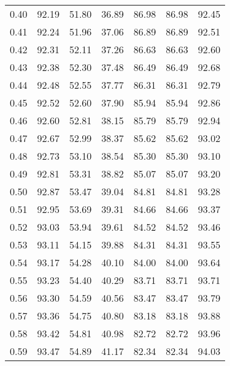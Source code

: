 \begin{tabular}{|c|c|c|c|c|c|c|}
      0.40 &     92.19 &     51.80 &      36.89 &   86.98 &      86.98 &         92.45 \\
      0.41 &     92.24 &     51.96 &      37.06 &   86.89 &      86.89 &         92.51 \\
      0.42 &     92.31 &     52.11 &      37.26 &   86.63 &      86.63 &         92.60 \\
      0.43 &     92.38 &     52.30 &      37.48 &   86.49 &      86.49 &         92.68 \\
      0.44 &     92.48 &     52.55 &      37.77 &   86.31 &      86.31 &         92.79 \\
      0.45 &     92.52 &     52.60 &      37.90 &   85.94 &      85.94 &         92.86 \\
      0.46 &     92.60 &     52.81 &      38.15 &   85.79 &      85.79 &         92.94 \\
      0.47 &     92.67 &     52.99 &      38.37 &   85.62 &      85.62 &         93.02 \\
      0.48 &     92.73 &     53.10 &      38.54 &   85.30 &      85.30 &         93.10 \\
      0.49 &     92.81 &     53.31 &      38.82 &   85.07 &      85.07 &         93.20 \\
      0.50 &     92.87 &     53.47 &      39.04 &   84.81 &      84.81 &         93.28 \\
      0.51 &     92.95 &     53.69 &      39.31 &   84.66 &      84.66 &         93.37 \\
      0.52 &     93.03 &     53.94 &      39.61 &   84.52 &      84.52 &         93.46 \\
      0.53 &     93.11 &     54.15 &      39.88 &   84.31 &      84.31 &         93.55 \\
      0.54 &     93.17 &     54.28 &      40.10 &   84.00 &      84.00 &         93.64 \\
      0.55 &     93.23 &     54.40 &      40.29 &   83.71 &      83.71 &         93.71 \\
      0.56 &     93.30 &     54.59 &      40.56 &   83.47 &      83.47 &         93.79 \\
      0.57 &     93.36 &     54.75 &      40.80 &   83.18 &      83.18 &         93.88 \\
      0.58 &     93.42 &     54.81 &      40.98 &   82.72 &      82.72 &         93.96 \\
      0.59 &     93.47 &     54.89 &      41.17 &   82.34 &      82.34 &         94.03 \\

\end{tabular}
